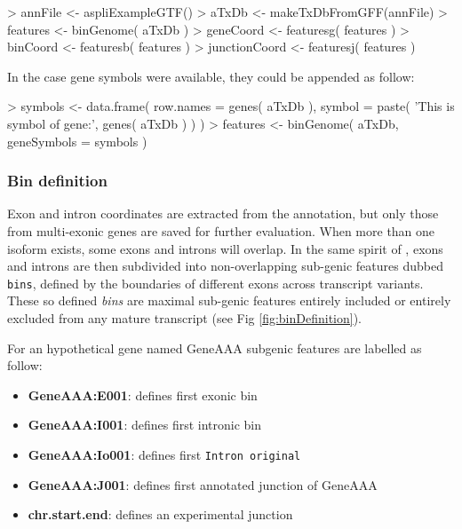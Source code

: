 \documentclass{article}
\begin{document}
\begin{Schunk}
\begin{Sinput}
> annFile       <- aspliExampleGTF()
> aTxDb         <- makeTxDbFromGFF(annFile)
> features      <- binGenome( aTxDb ) 
> geneCoord     <- featuresg( features )
> binCoord      <- featuresb( features )
> junctionCoord <- featuresj( features )
\end{Sinput}
\end{Schunk}

In the case gene symbols were available, they could be appended as follow:

\begin{Schunk}
\begin{Sinput}
> symbols       <- data.frame( row.names = genes( aTxDb ), 
                              symbol = paste( 'This is symbol of gene:',
                                              genes( aTxDb ) ) )
> features      <- binGenome( aTxDb, geneSymbols = symbols ) 
\end{Sinput}
\end{Schunk}

\subsubsection{Bin definition}\label{sec:binDefinition}

Exon and intron coordinates are extracted from the annotation, but only those from multi-exonic genes are saved for further evaluation. When more than one isoform exists, some exons and introns will overlap. In the same spirit of \cite{pmid22722343}, exons and introns are then subdivided into non-overlapping sub-genic features dubbed \texttt{bins},  defined by the boundaries of different exons across transcript variants. These so defined {\em bins} are maximal sub-genic features entirely included or entirely excluded from any mature transcript (see Fig \ref{fig:binDefinition}).

For an hypothetical gene named GeneAAA subgenic features are labelled as follow: 
\begin{itemize}
  \item \textbf{GeneAAA:E001}: defines first exonic bin
  \item \textbf{GeneAAA:I001}: defines first intronic bin
  \item \textbf{GeneAAA:Io001}: defines first \texttt{Intron original}
  \item \textbf{GeneAAA:J001}: defines first annotated junction of GeneAAA
  \item \textbf{chr.start.end}: defines an experimental junction
\end{itemize}
\end{document}
